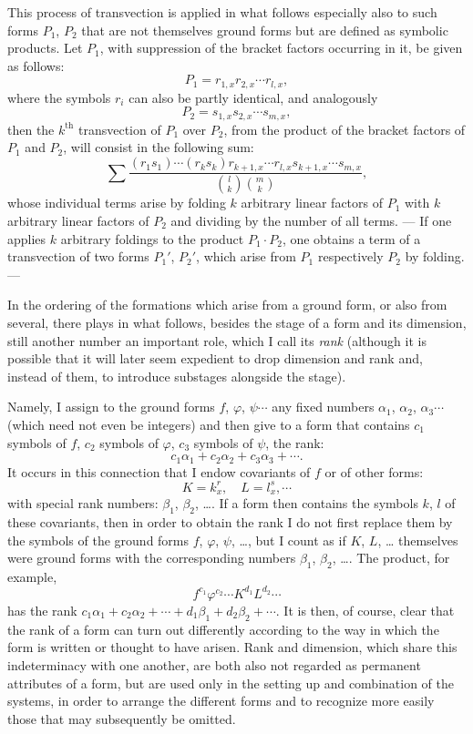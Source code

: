 \documentclass[10pt]{article}
\begin{document}
This process of transvection is applied in what follows especially also to such forms $P_1$, $P_2$ that are not themselves ground forms but are defined as symbolic products. Let $P_1$, with suppression of the bracket factors occurring in it, be given as follows:
\[
P_1=r_{1,x}r_{2,x}\cdots r_{l,x},
\]
where the symbols $r_i$ can also be partly identical, and analogously
\[
P_2=s_{1,x}s_{2,x}\cdots s_{m,x},
\]
then the $k^{\mathrm{th}}$ transvection of $P_1$ over $P_2$, from the product of the bracket factors of $P_1$ and $P_2$, will consist in the following sum:
\[
\sum \frac{(r_1s_1)\cdots(r_ks_k)r_{k+1,x}\cdots r_{l,x}s_{k+1,x}\cdots s_{m,x}}{\binom{l}{k}\binom{m}{k}},
\]
whose individual terms arise by folding $k$ arbitrary linear factors of $P_1$ with $k$ arbitrary linear factors of $P_2$ and dividing by the number of all terms. --- If one applies $k$ arbitrary foldings to the product $P_1\cdot P_2$, one obtains a term of a transvection of two forms $P_1'$, $P_2'$, which arise from $P_1$ respectively $P_2$ by folding. ---

In the ordering of the formations which arise from a ground form, or also from several, there plays in what follows, besides the stage of a form and its dimension, still another number an important role, which I call its \emph{rank} (although it is possible that it will later seem expedient to drop dimension and rank and, instead of them, to introduce substages alongside the stage).

Namely, I assign to the ground forms $f$, $\varphi$, $\psi\cdots$ any fixed numbers $\alpha_1$, $\alpha_2$, $\alpha_3\cdots$ (which need not even be integers) and then give to a form that contains $c_1$ symbols of $f$, $c_2$ symbols of $\varphi$, $c_3$ symbols of $\psi$, the rank:
\[
c_1\alpha_1+c_2\alpha_2+c_3\alpha_3+\cdots.
\]
It occurs in this connection that I endow covariants of $f$ or of other forms:
\[
K=k_x^r,\quad L=l_x^s,\cdots
\]
with special rank numbers: $\beta_1$, $\beta_2$, \ldots. If a form then contains the symbols $k$, $l$ of these covariants, then in order to obtain the rank I do not first replace them by the symbols of the ground forms $f$, $\varphi$, $\psi$, \ldots, but I count as if $K$, $L$, \ldots{} themselves were ground forms with the corresponding numbers $\beta_1$, $\beta_2$, \ldots. The product, for example,
\[
f^{c_1}\varphi^{c_2}\cdots K^{d_1}L^{d_2}\cdots
\]
has the rank $c_1\alpha_1+c_2\alpha_2+\cdots+d_1\beta_1+d_2\beta_2+\cdots$. It is then, of course, clear that the rank of a form can turn out differently according to the way in which the form is written or thought to have arisen. Rank and dimension, which share this indeterminacy with one another, are both also not regarded as permanent attributes of a form, but are used only in the setting up and combination of the systems, in order to arrange the different forms and to recognize more easily those that may subsequently be omitted.
\end{document}
